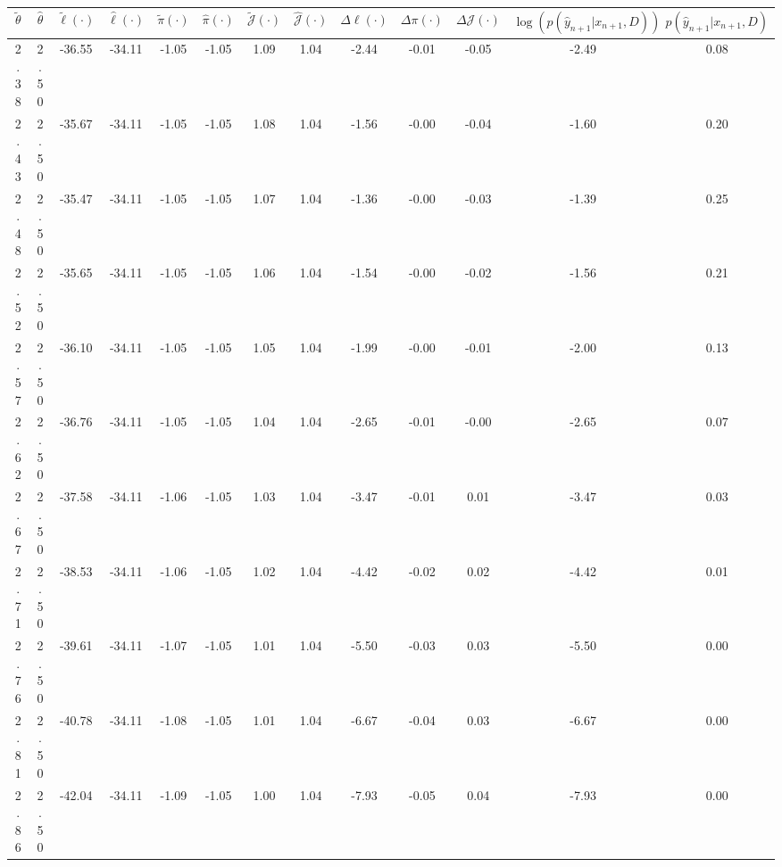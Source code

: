 \begin{table}[htbp]
        \centering
        \tiny
        \begin{adjustbox}{angle=90}
            \begin{tabular}{|c|c|c|c|c|c|c|c|c|c|c|c|c|}
                \hline
                 $\tilde{\theta}$ & $\hat{\theta}$ & $\tilde{\ell}(\cdot)$ & $\hat{\ell}(\cdot)$ & $\tilde{\pi}(\cdot)$ & $\hat{\pi}(\cdot)$ & $\tilde{\mathcal{J}}(\cdot)$ & $\hat{\mathcal{J}}(\cdot)$ & $\Delta \ell(\cdot)$ & $\Delta \pi(\cdot)$ & $\Delta \mathcal{J}(\cdot)$ & $\log(p(\hat{y}_{n+1}|x_{n+1}, D))$ & $p(\hat{y}_{n+1}|x_{n+1}, D)$ \\
                \hline
                 2.38 & 2.50 & -36.55 & -34.11 & -1.05 & -1.05 & 1.09 & 1.04 & -2.44 & -0.01 & -0.05 & -2.49 & 0.08\\ \hline
 2.43 & 2.50 & -35.67 & -34.11 & -1.05 & -1.05 & 1.08 & 1.04 & -1.56 & -0.00 & -0.04 & -1.60 & 0.20\\ \hline
 2.48 & 2.50 & -35.47 & -34.11 & -1.05 & -1.05 & 1.07 & 1.04 & -1.36 & -0.00 & -0.03 & -1.39 & 0.25\\ \hline
 2.52 & 2.50 & -35.65 & -34.11 & -1.05 & -1.05 & 1.06 & 1.04 & -1.54 & -0.00 & -0.02 & -1.56 & 0.21\\ \hline
 2.57 & 2.50 & -36.10 & -34.11 & -1.05 & -1.05 & 1.05 & 1.04 & -1.99 & -0.00 & -0.01 & -2.00 & 0.13\\ \hline
 2.62 & 2.50 & -36.76 & -34.11 & -1.05 & -1.05 & 1.04 & 1.04 & -2.65 & -0.01 & -0.00 & -2.65 & 0.07\\ \hline
 2.67 & 2.50 & -37.58 & -34.11 & -1.06 & -1.05 & 1.03 & 1.04 & -3.47 & -0.01 & 0.01 & -3.47 & 0.03\\ \hline
 2.71 & 2.50 & -38.53 & -34.11 & -1.06 & -1.05 & 1.02 & 1.04 & -4.42 & -0.02 & 0.02 & -4.42 & 0.01\\ \hline
 2.76 & 2.50 & -39.61 & -34.11 & -1.07 & -1.05 & 1.01 & 1.04 & -5.50 & -0.03 & 0.03 & -5.50 & 0.00\\ \hline
 2.81 & 2.50 & -40.78 & -34.11 & -1.08 & -1.05 & 1.01 & 1.04 & -6.67 & -0.04 & 0.03 & -6.67 & 0.00\\ \hline
 2.86 & 2.50 & -42.04 & -34.11 & -1.09 & -1.05 & 1.00 & 1.04 & -7.93 & -0.05 & 0.04 & -7.93 & 0.00\\ \hline
            \end{tabular}
        \end{adjustbox}
        \caption{}
        \label{}
    \end{table}
    